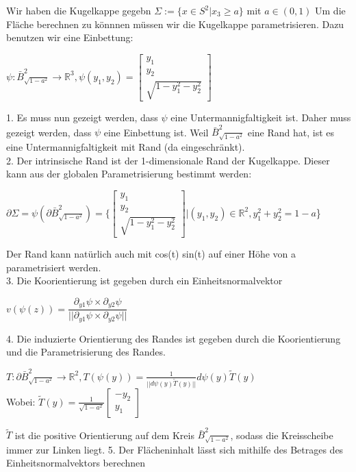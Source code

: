 \documentclass[a4paper, fontsize = 8pt, landscape]{scrartcl}
\newcommand{\R}[0]{\mathbb{R}}
\begin{document}
\begin{multicols*}{3}
    Wir haben die Kugelkappe gegebn $\Sigma := \{x \in S^2 | x_3 \geq a\}$ mit $a \in (0,1)$
    Um die Fläche berechnen zu könnnen müssen wir die Kugelkappe parametrisieren. Dazu benutzen wir eine Einbettung:
    \begin{center}
        $\psi: \bar{B}^2_{\sqrt{1-a^2}} \rightarrow \R^3, \psi(y_1, y_2)=\begin{bmatrix*}
                y_1 \\ y_2 \\ \sqrt{1-y_1^2-y_2^2}
            \end{bmatrix*}$
    \end{center}
    1. Es muss nun gezeigt werden, dass $\psi$ eine Untermannigfaltigkeit ist. Daher muss gezeigt werden, dass $\psi$ eine Einbettung ist. Weil $\bar{B}^2_{\sqrt{1-a^2}}$ eine Rand hat, ist es eine Untermannigfaltigkeit mit Rand (da eingeschränkt). \\
    2. Der intrinsische Rand ist der 1-dimensionale Rand der Kugelkappe. Dieser kann aus der globalen Parametrisierung bestimmt werden:
    \begin{center}
        $\partial\Sigma = \psi(\partial \bar{B}^2_{\sqrt{1-a^2}})=\{\begin{bmatrix}
                y_1 \\ y_2 \\ \sqrt{1-y_1^2-y_2^2}
            \end{bmatrix} | (y_1, y_2) \in \R^2, y_1^2+y_2^2=1-a$\}
    \end{center}
    Der Rand kann natürlich auch mit cos(t) sin(t) auf einer Höhe von a parametrisiert werden. \\
    3. Die Koorientierung ist gegeben durch ein Einheitsnormalvektor
    \begin{center}
        $v(\psi(z)) = \dfrac{\partial_{y1} \psi \times \partial_{y2} \psi}{|| \partial_{y1} \psi \times \partial_{y2} \psi ||}$
    \end{center}
    4. Die induzierte Orientierung des Randes ist gegeben durch die Koorientierung und die Parametrisierung des Randes.
    \begin{center}
        $T: \partial \bar{B}^2_{\sqrt{1-a^2}} \rightarrow \R^2, T(\psi(y)) = \frac{1}{||d\psi(y)\tilde{T}(y)||}d\psi(y)\tilde{T}(y)$ \\
        Wobei: $\tilde{T}(y) = \frac{1}{\sqrt{1-a^2}} \begin{bmatrix}
                -y_2 \\ y_1
            \end{bmatrix}$
    \end{center}
    $\tilde{T}$ ist die positive Orientierung auf dem Kreis $\bar{B}^2_{\sqrt{1-a^2}}$, sodass die Kreisscheibe immer zur Linken liegt.
    5. Der Flächeninhalt lässt sich mithilfe des Betrages des Einheitsnormalvektors berechnen \\


\end{multicols*}
\end{document}
